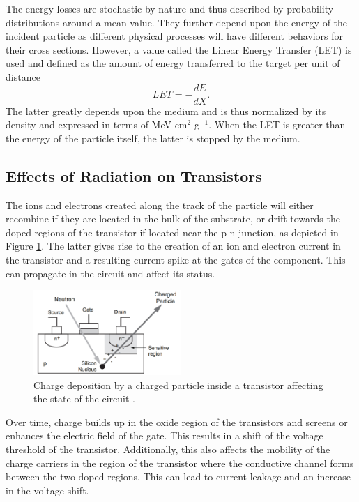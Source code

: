       The energy losses are stochastic by nature and thus described by probability distributions around a mean value. They further depend upon the energy of the incident particle as different physical processes will have different behaviors for their cross sections. However, a value called the Linear Energy Transfer (LET) is used and defined as the amount of energy transferred to the target per unit of distance
      \begin{equation}
        LET = - \frac{dE}{dX} .
      \end{equation}
      The latter greatly depends upon the medium and is thus normalized by its density and expressed in terms of MeV cm$^2$ g$^{-1}$. When the LET is greater than the energy of the particle itself, the latter is stopped by the medium.

    \subsection{Effects of Radiation on Transistors}

      The ions and electrons created along the track of the particle will either recombine if they are located in the bulk of the substrate, or drift towards the doped regions of the transistor if located near the p-n junction, as depicted in Figure \ref{fig:II-5-transistor}. The latter gives rise to the creation of an ion and electron current in the transistor and a resulting current spike at the gates of the component. This can propagate in the circuit and affect its status. \\

      \begin{figure}[h!]
        \centering
        \includegraphics[width=0.5\textwidth]{img/II-5-irradiation/transistor.png}
        \caption{Charge deposition by a charged particle inside a transistor affecting the state of the circuit \cite{XILINX-RADIATION}.}
        \label{fig:II-5-transistor}
      \end{figure}

      Over time, charge builds up in the oxide region of the transistors and screens or enhances the electric field of the gate. This results in a shift of the voltage threshold of the transistor. Additionally, this also affects the mobility of the charge carriers in the region of the transistor where the conductive channel forms between the two doped regions. This can lead to current leakage and an increase in the voltage shift.

